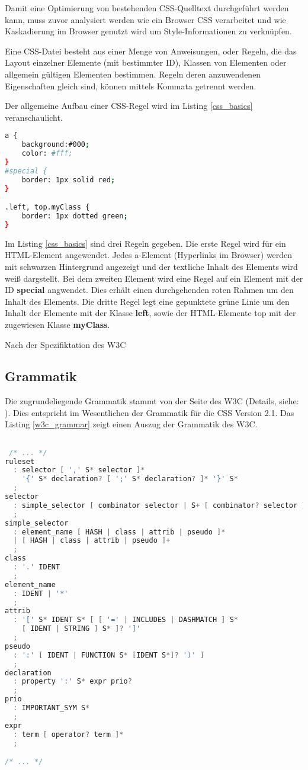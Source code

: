 Damit eine Optimierung von bestehenden CSS-Quelltext durchgeführt werden kann, muss zuvor analysiert werden wie ein Browser CSS verarbeitet und wie Kaskadierung im Browser genutzt wird um Style-Informationen zu verknüpfen.

Eine CSS-Datei besteht aus einer Menge von Anweisungen, oder Regeln, die das Layout einzelner Elemente (mit bestimmter ID), Klassen von Elementen oder allgemein gültigen Elementen bestimmen. Regeln deren anzuwendenen Eigenschaften gleich sind, können mittels Kommata getrennt werden.

Der allgemeine Aufbau einer CSS-Regel wird im Listing \ref{css_basics} veranschaulicht.   

\begin{lstlisting}[label=css_basics,language=bash, caption=Aufbau einer CSS-Regel]
a {
    background:#000;
    color: #fff;
}  
#special {
    border: 1px solid red;
}

.left, top.myClass {
    border: 1px dotted green;
}
\end{lstlisting}

Im Listing \ref{css_basics} sind drei Regeln gegeben. Die erste Regel wird für ein HTML-Element angewendet. Jedes a-Element (Hyperlinks im Browser) werden mit schwarzen Hintergrund angezeigt und der textliche Inhalt des Elements wird weiß dargstellt. Bei dem zweiten Element wird eine Regel auf ein Element mit der ID \textbf{special} angwendet. Dies erhält einen durchgehenden roten Rahmen um den Inhalt des Elements. Die dritte Regel legt eine gepunktete grüne Linie um den Inhalt der Elemente mit der Klasse \textbf{left}, sowie der HTML-Elemente top mit der zugewiesen Klasse \textbf{myClass}.  

Nach der Spezifiktation des W3C
\subsection{Grammatik}

Die zugrundeliegende Grammatik stammt von der Seite des W3C (Details, siehe: \cite{w3c_css_grammar}). Dies entspricht im Wesentlichen der Grammatik für die CSS Version 2.1. Das Listing \ref{w3c_grammar} zeigt einen Auszug der Grammatik des W3C. 

\begin{lstlisting}[label=w3c_grammar,language=C, caption=Grammatik des W3C]

 /* ... */
ruleset
  : selector [ ',' S* selector ]*
    '{' S* declaration? [ ';' S* declaration? ]* '}' S*
  ;
selector
  : simple_selector [ combinator selector | S+ [ combinator? selector ]? ]?
  ;
simple_selector
  : element_name [ HASH | class | attrib | pseudo ]*
  | [ HASH | class | attrib | pseudo ]+
  ;
class
  : '.' IDENT
  ;
element_name
  : IDENT | '*'
  ;
attrib
  : '[' S* IDENT S* [ [ '=' | INCLUDES | DASHMATCH ] S*
    [ IDENT | STRING ] S* ]? ']'
  ;
pseudo
  : ':' [ IDENT | FUNCTION S* [IDENT S*]? ')' ]
  ;
declaration
  : property ':' S* expr prio?
  ;
prio
  : IMPORTANT_SYM S*
  ;
expr
  : term [ operator? term ]*
  ;

/* ... */

\end{lstlisting}

